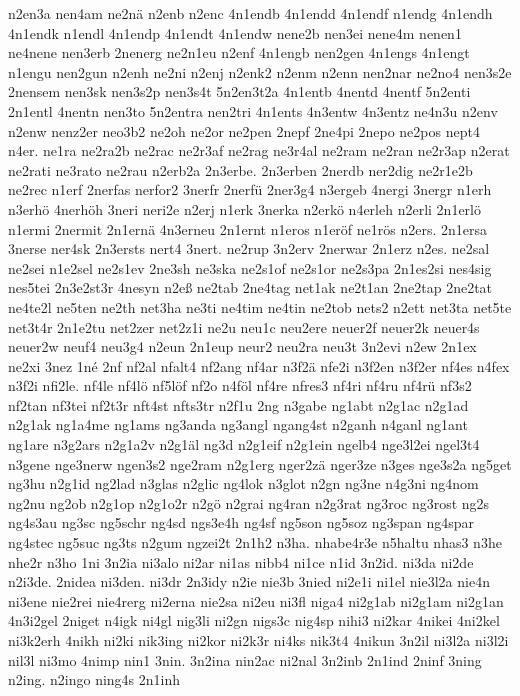 {n2en3a
nen4am
ne2nä
n2enb
n2enc
4n1endb
4n1endd
4n1endf
n1endg
4n1endh
4n1endk
n1endl
4n1endp
4n1endt
4n1endw
nene2b
nen3ei
nene4m
nenen1
ne4nene
nen3erb
2nenerg
ne2n1eu
n2enf
4n1engb
nen2gen
4n1engs
4n1engt
n1engu
nen2gun
n2enh
ne2ni
n2enj
n2enk2
n2enm
n2enn
nen2nar
ne2no4
nen3s2e
2nensem
nen3sk
nen3s2p
nen3s4t
5n2en3t2a
4n1entb
4nentd
4nentf
5n2enti
2n1entl
4nentn
nen3to
5n2entra
nen2tri
4n1ents
4n3entw
4n3entz
ne4n3u
n2env
n2enw
nenz2er
neo3b2
ne2oh
ne2or
ne2pen
2nepf
2ne4pi
2nepo
ne2pos
nept4
n4er.
ne1ra
ne2ra2b
ne2rac
ne2r3af
ne2rag
ne3r4al
ne2ram
ne2ran
ne2r3ap
n2erat
ne2rati
ne3rato
ne2rau
n2erb2a
2n3erbe.
2n3erben
2nerdb
ner2dig
ne2r1e2b
ne2rec
n1erf
2nerfas
nerfor2
3nerfr
2nerfü
2ner3g4
n3ergeb
4nergi
3nergr
n1erh
n3erhö
4nerhöh
3neri
neri2e
n2erj
n1erk
3nerka
n2erkö
n4erleh
n2erli
2n1erlö
n1ermi
2nermit
2n1ernä
4n3erneu
2n1ernt
n1eros
n1eröf
ne1rös
n2ers.
2n1ersa
3nerse
ner4sk
2n3ersts
nert4
3nert.
ne2rup
3n2erv
2nerwar
2n1erz
n2es.
ne2sal
ne2sei
n1e2sel
ne2s1ev
2ne3sh
ne3ska
ne2s1of
ne2s1or
ne2s3pa
2n1es2si
nes4sig
nes5tei
2n3e2st3r
4nesyn
n2eß
ne2tab
2ne4tag
net1ak
ne2t1an
2ne2tap
2ne2tat
ne4te2l
ne5ten
ne2th
net3ha
ne3ti
ne4tim
ne4tin
ne2tob
nets2
n2ett
net3ta
net5te
net3t4r
2n1e2tu
net2zer
net2z1i
ne2u
neu1c
neu2ere
neuer2f
neuer2k
neuer4s
neuer2w
neuf4
neu3g4
n2eun
2n1eup
neur2
neu2ra
neu3t
3n2evi
n2ew
2n1ex
ne2xi
3nez
1né
2nf
nf2al
nfalt4
nf2ang
nf4ar
n3f2ä
nfe2i
n3f2en
n3f2er
nf4es
n4fex
n3f2i
nfi2le.
nf4le
nf4lö
nf5löf
nf2o
n4föl
nf4re
nfres3
nf4ri
nf4ru
nf4rü
nf3s2
nf2tan
nf3tei
nf2t3r
nft4st
nfts3tr
n2f1u
2ng
n3gabe
ng1abt
n2g1ac
n2g1ad
n2g1ak
ng1a4me
ng1ams
ng3anda
ng3angl
ngang4st
n2ganh
n4ganl
ng1ant
ng1are
n3g2ars
n2g1a2v
n2g1äl
ng3d
n2g1eif
n2g1ein
ngelb4
nge3l2ei
ngel3t4
n3gene
nge3nerw
ngen3s2
nge2ram
n2g1erg
nger2zä
nger3ze
n3ges
nge3s2a
ng5get
ng3hu
n2g1id
ng2lad
n3glas
n2glic
ng4lok
n3glot
n2gn
ng3ne
n4g3ni
ng4nom
ng2nu
ng2ob
n2g1op
n2g1o2r
n2gö
n2grai
ng4ran
n2g3rat
ng3roc
ng3rost
ng2s
ng4s3au
ng3sc
ng5schr
ng4sd
ngs3e4h
ng4sf
ng5son
ng5soz
ng3span
ng4spar
ng4stec
ng5suc
ng3ts
n2gum
ngzei2t
2n1h2
n3ha.
nhabe4r3e
n5haltu
nhas3
n3he
nhe2r
n3ho
1ni
3n2ia
ni3alo
ni2ar
ni1as
nibb4
ni1ce
n1id
3n2id.
ni3da
ni2de
n2i3de.
2nidea
ni3den.
ni3dr
2n3idy
n2ie
nie3b
3nied
ni2e1i
ni1el
nie3l2a
nie4n
ni3ene
nie2rei
nie4rerg
ni2erna
nie2sa
ni2eu
ni3fl
niga4
ni2g1ab
ni2g1am
ni2g1an
4n3i2gel
2niget
n4igk
ni4gl
nig3li
ni2gn
nigs3c
nig4sp
nihi3
ni2kar
4nikei
4ni2kel
ni3k2erh
4nikh
ni2ki
nik3ing
ni2kor
ni2k3r
ni4ks
nik3t4
4nikun
3n2il
ni3l2a
ni3l2i
nil3l
ni3mo
4nimp
nin1
3nin.
3n2ina
nin2ac
ni2nal
3n2inb
2n1ind
2ninf
3ning
n2ing.
n2ingo
ning4s
2n1inh
}
